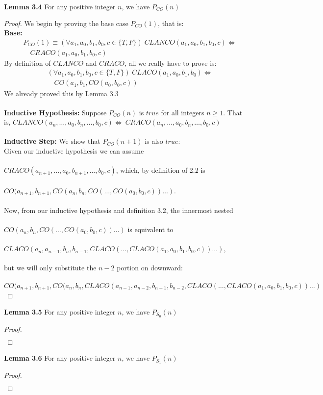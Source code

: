 \documentclass{article}
\begin{document}
\noindent \textbf{Lemma 3.4}  For any positive integer $n$, we have $ P_{CO}(n)$
\begin{proof} We begin by proving the base case $P_{CO}(1)$, that is: \\ 
	\textbf{Base:}
	\begin{align*}
	 & P_{CO}(1) \equiv  (\forall a_1, a_0, b_1, b_0, c \in \{T, F\} ) \;  CLANCO(a_1, a_0, b_1, b_0, c) \iff  \\ & \quad  CRACO(a_1, a_0, b_1, b_0, c) 
	\end{align*}
	By definition of $CLANCO$ and $CRACO$, all we really have to prove is:
	\begin{align*}
	&  (\forall a_1, a_0, b_1, b_0, c \in \{T, F\} ) \; CLACO(a_1, a_0, b_1, b_0) \iff \\ 
	& \quad CO(a_1, b_1, CO(a_0, b_0, c)) 
	\end{align*}
	We already proved this by Lemma 3.3 \\ \\
	\textbf{Inductive Hypothesis:} Suppose $P_{CO}(n) $ is $true$ for all integers $n \geq 1$. That is, $CLANCO(a_n, \ldots, a_0, b_n, \ldots, b_0, c) \iff 
	 \: CRACO(a_n, \ldots, a_0, b_n, \ldots, b_0, c)$  \\ \\
	\textbf{Inductive Step:} We show that $P_{CO}(n+1)$ is also $true$: \\
	Given our inductive hypothesis we can assume \\  \\
	 $ CRACO(a_{n+1}, \ldots, a_0, b_{n+1}, \ldots, b_0, c)$, which, by definition of 2.2 is \\ \\
	   $CO(a_{n+1}, b_{n+1}, CO(a_n, b_n, CO(\ldots, CO(a_0, b_0, c))\ldots)$. \\ \\
	    Now, from our inductive hypothesis and definition 3.2, the innermost nested \\ \\
	     $CO(a_n, b_n, CO(\ldots, CO(a_0, b_0, c))\ldots)$  is equivalent to \\ \\
	      $CLACO(a_n, a_{n-1}, b_n, b_{n-1}, CLACO(\ldots, CLACO(a_1, a_0, b_1, b_0, c))\ldots)$, \\ \\ 
	      but we will only substitute the $n-2$ portion on downward: \\ \\
	    
	       $CO(a_{n+1}, b_{n+1}, CO(a_n, b_n, CLACO(a_{n-1}, a_{n-2}, b_{n-1}, b_{n-2}, CLACO(\ldots, CLACO(a_1, a_0, b_1, b_0, c))\ldots)$
	      
	      
	      
	 
	 
	
\end{proof}

\noindent \textbf{Lemma 3.5} For any positive integer $n$, we have $ P_{S_0}(n) $
\begin{proof}
	\begin{align*}
	\end{align*}
\end{proof}

\noindent \textbf{Lemma 3.6} For any positive integer $n$, we have $ P_{S_1}(n) $
\begin{proof}
	\begin{align*}
	\end{align*}
\end{proof}
\end{document}

